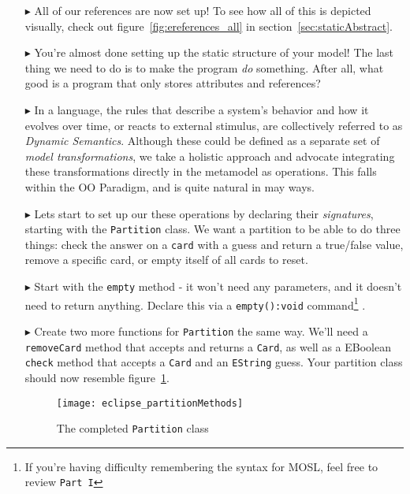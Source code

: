 \begin{itemize}
\item[$\blacktriangleright$] All of our references are now set up! To see how all of this is depicted visually, check out figure~\ref{fig:ereferences_all} in section~\ref{sec:staticAbstract}.

\pagebreak

\item[$\blacktriangleright$] You're almost done setting up the static structure of your model! The last thing we need to do is to make the program \emph{do} something. After all, what good is a program that only stores attributes and references?

\item[$\blacktriangleright$] In a language, the rules that describe a system's behavior and how it evolves over time, or reacts to external stimulus, are collectively referred to as \emph{Dynamic Semantics}. Although these could be defined as a separate set of \emph{model transformations}, we take a holistic approach and advocate integrating these transformations directly in the metamodel as operations. This falls within the OO Paradigm, and is quite natural in may ways.

\item[$\blacktriangleright$] Lets start to set up our these operations by declaring their \emph{signatures}, starting with the \texttt{Partition} class. We want a partition to be able to do three things: check the answer on a \texttt{card} with a guess and return a true/false value, remove a specific card, or empty itself of all cards to reset. 

\item[$\blacktriangleright$] Start with the \texttt{empty} method - it won't need any parameters, and it doesn't need to return anything. Declare this via a \texttt{empty():void} command\footnote{If you're having difficulty remembering the syntax for MOSL, feel free to review \mbox{\texttt{Part I}}} .

\item[$\blacktriangleright$] Create two more functions for \texttt{Partition} the same way. We'll need a \texttt{removeCard} method that accepts and returns a \texttt{Card}, as well as a EBoolean \texttt{check} method that accepts a \texttt{Card} and an \texttt{EString} guess. Your partition class should now resemble figure~\ref{fig:partitionMethods}.

\begin{figure}[htbp]
	\centering
  \texttt{[image: eclipse\_partitionMethods]}
	\caption{The completed \texttt{Partition} class}
	\label{fig:partitionMethods}
\end{figure}


\end{itemize}
